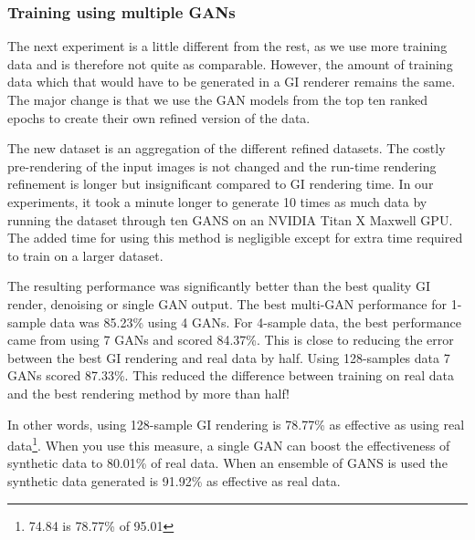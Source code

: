 \documentclass[10pt,twocolumn,letterpaper]{article}
\begin{document}
\subsubsection{Training using multiple GANs} \label{sec:multigans}
The next experiment is a little different from the rest, as we use more training data and is therefore not quite as comparable.  However, the amount of training data which that would have to be generated in a GI renderer remains the same.  The major change is that we use the GAN models from the top ten ranked epochs to create their own refined version of the data.

The new dataset is an aggregation of the different refined datasets.  The costly pre-rendering of the input images is not changed and the run-time rendering refinement is longer but insignificant compared to GI rendering time.  In our experiments, it took a minute longer to generate 10 times as much data by running the dataset through ten GANS on an NVIDIA Titan X Maxwell GPU. %
The added time for using this method is negligible except for extra time required to train on a larger dataset.

The resulting performance was significantly better than the best quality GI render, denoising or single GAN output.  The best multi-GAN performance for 1-sample data was 85.23\% using 4 GANs.  For 4-sample data, the best performance came from using 7 GANs and scored 84.37\%. This is close to reducing the error between the best GI rendering and real data by half. Using 128-samples data 7 GANs scored 87.33\%. This reduced the difference between training on real data and the best rendering method by more than half!

In other words, using 128-sample GI rendering is 78.77\% as effective as using real data\footnote{74.84 is 78.77\% of 95.01}.  When you use this measure, a single GAN can boost the effectiveness of synthetic data to 80.01\% of real data.  When an ensemble of GANS is used the synthetic data generated is 91.92\% as effective as real data. 

\end{document}

